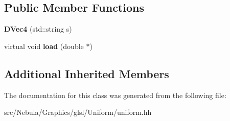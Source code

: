 \subsection*{Public Member Functions}
\begin{DoxyCompactItemize}
\item 
\hypertarget{classNeb_1_1glsl_1_1Uniform_1_1Scalar_1_1DVec4_ab8470910b7562c6a60cb01270b1fa028}{{\bfseries D\-Vec4} (std\-::string s)}\label{classNeb_1_1glsl_1_1Uniform_1_1Scalar_1_1DVec4_ab8470910b7562c6a60cb01270b1fa028}

\item 
\hypertarget{classNeb_1_1glsl_1_1Uniform_1_1Scalar_1_1DVec4_af843bf42042cbe62f8744a1621ef4178}{virtual void {\bfseries load} (double $\ast$)}\label{classNeb_1_1glsl_1_1Uniform_1_1Scalar_1_1DVec4_af843bf42042cbe62f8744a1621ef4178}

\end{DoxyCompactItemize}
\subsection*{Additional Inherited Members}


The documentation for this class was generated from the following file\-:\begin{DoxyCompactItemize}
\item 
src/\-Nebula/\-Graphics/glsl/\-Uniform/uniform.\-hh\end{DoxyCompactItemize}
